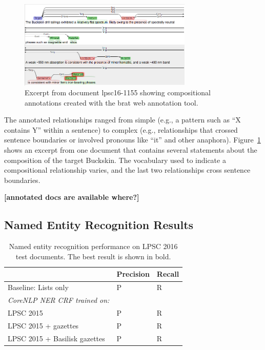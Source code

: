 \documentclass[letterpaper]{article} %
\begin{document}
\begin{figure}
\begin{center}
\includegraphics[width=3.25in]{fig/brat-example.png}
\end{center}
\caption{Excerpt from document lpsc16-1155 showing compositional
annotations created with the brat web annotation tool.}
\label{fig:brat}
\end{figure}

The annotated relationships ranged from simple (e.g., a pattern such
as ``X contains Y'' within a sentence) to complex (e.g., relationships
that crossed sentence boundaries or involved pronouns like ``it'' and
other anaphora).  Figure~\ref{fig:brat} shows an excerpt from one
document that contains several statements about the composition of the
target Buckskin.  The vocabulary used to indicate a compositional
relationship varies, and the last two relationships cross sentence
boundaries.  

{\bf [annotated docs are available where?]}

\subsection{Named Entity Recognition Results}

\begin{table}
\caption{Named entity recognition performance on LPSC 2016 test documents.  
The best result is shown in bold.}
\label{tab:ner}
\begin{center}
\begin{tabular}{l|ll}
 & Precision & Recall \\ \hline
Baseline: Lists only & P & R \\ \hline
{\em CoreNLP NER CRF trained on:} & & \\
LPSC 2015 & P & R \\
LPSC 2015 + gazettes & P & R \\
LPSC 2015 + Basilisk gazettes & P & R \\
\hline
\end{tabular}
\end{center}
\end{table}
\end{document}
